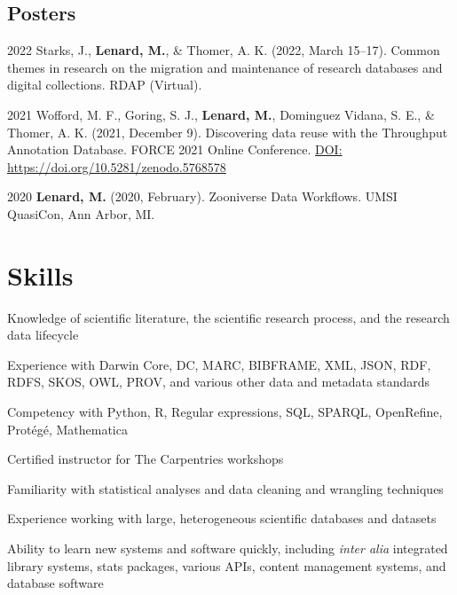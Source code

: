 \documentclass[12pt,letterpaper]{report}
\newcommand{\listitemspace}{0.25em}
\renewenvironment{itemize}
{\begin{list}{}{\setlength{\leftmargin}{0em}
            \setlength{\parskip}{0em}
            \setlength{\itemsep}{\listitemspace}
            \setlength{\parsep}{\listitemspace}}}
{\end{list}}
\begin{document}
\subsection*{Posters}
    
\begin{tablist}
    
	\item[2022] \tab Starks, J., \textbf{Lenard, M.}, \& Thomer, A. K. (2022, March 15--17). Common themes in research on the migration and maintenance of research databases and digital collections. RDAP (Virtual).
	
	\item[2021] \tab Wofford, M. F., Goring, S. J., \textbf{Lenard, M.}, Dominguez Vidana, S. E., \& Thomer, A. K. (2021, December 9). Discovering data reuse with the Throughput Annotation Database. FORCE 2021 Online Conference. \href{https://doi.org/10.5281/zenodo.5768578}{DOI: https://doi.org/10.5281/zenodo.5768578}
	
	\item[2020] \tab \textbf{Lenard, M.} (2020, February). Zooniverse Data Workflows. UMSI QuasiCon, Ann Arbor, MI.

\end{tablist}



\section*{Skills}

\begin{itemize}

	\item Knowledge of scientific literature, the scientific research process, and the research data lifecycle
        
	\item Experience with Darwin Core, DC, MARC, BIBFRAME, XML, JSON, RDF, RDFS, SKOS, OWL, PROV, and various other data and metadata standards
        
	\item Competency with Python, R, Regular expressions, SQL, SPARQL, OpenRefine, Protégé, Mathematica
	
	\item Certified instructor for The Carpentries workshops
        
	\item Familiarity with statistical analyses and data cleaning and wrangling techniques

	\item Experience working with large, heterogeneous scientific databases and datasets

	\item Ability to learn new systems and software quickly, including \textit{inter alia} integrated library systems, stats packages, various APIs, content management systems, and database software
        
\end{itemize}
\end{document}
